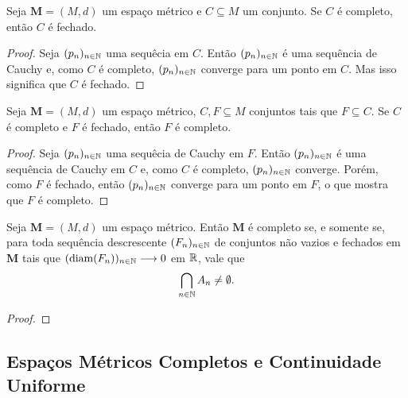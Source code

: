 \begin{prop}
	Seja $\bm M = (M,d)$ um espaço métrico e $C \subseteq M$ um conjunto. Se $C$ é completo, então $C$ é fechado.
\end{prop}
\begin{proof}
	Seja $(p_n)_{n \in \mathbb{N}}$ uma sequêcia em $C$. Então $(p_n)_{n \in \mathbb{N}}$ é uma sequência de Cauchy e, como $C$ é completo, $(p_n)_{n \in \mathbb{N}}$ converge para um ponto em $C$. Mas isso significa que $C$ é fechado.
\end{proof}

\begin{prop}
	Seja $\bm M = (M,d)$ um espaço métrico, $C,F \subseteq M$ conjuntos tais que $F \subseteq C$. Se $C$ é completo e $F$ é fechado, então $F$ é completo.
\end{prop}
\begin{proof}
	Seja $(p_n)_{n \in \mathbb{N}}$ uma sequêcia de Cauchy em $F$. Então $(p_n)_{n \in \mathbb{N}}$ é uma sequência de Cauchy em $C$ e, como $C$ é completo, $(p_n)_{n \in \mathbb{N}}$ converge. Porém, como $F$ é fechado, então $(p_n)_{n \in \mathbb{N}}$ converge para um ponto em $F$, o que mostra que $F$ é completo.
\end{proof}

\begin{teo}
	Seja $\bm M =(M,d)$ um espaço métrico. Então $\bm M$ é completo se, e somente se, para toda sequência descrescente $(F_n)_{n \in \mathbb{N}}$ de conjuntos não vazios e fechados em $\bm M$ tais que $(\operatorname{diam}(F_n))_{n \in \mathbb{N}} \longrightarrow 0$ em $\mathbb{R}$, vale que
	\begin{equation*}
	\bigcap_{n \in \mathbb{N}} A_n \neq \emptyset.
	\end{equation*}
\end{teo}
\begin{proof}

\end{proof}

\subsection{Espaços Métricos Completos e Continuidade Uniforme}

